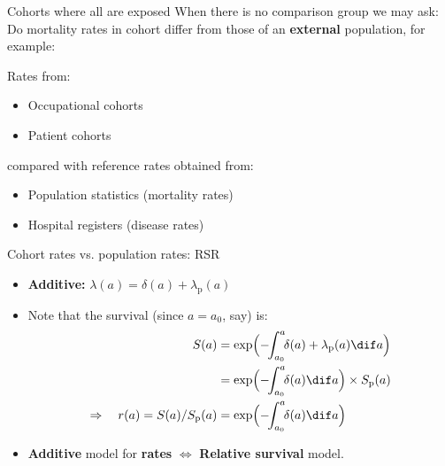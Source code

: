 \begin{frame}{Cohorts where all are exposed}
When there is no comparison group we may ask:\\
Do mortality rates in cohort differ from those of an
\textbf{external} population, for example:

\pause
Rates from:
\begin{itemize}
\item Occupational cohorts
\item Patient cohorts
\end{itemize}
\pause
compared with reference rates obtained from:
\begin{itemize}
\item Population statistics (mortality rates)
\item Hospital registers (disease rates)
\end{itemize}
\end{frame}

\begin{frame}{Cohort rates vs. population rates: RSR}
  \begin{itemize}
  \item \textbf{Additive:} $\lambda(a) = \delta(a) + \lambda_\text{p}(a)$
  \item Note that the survival (since $a=a_0$, say) is: \vspace*{-1ex}
\begin{align*}
     S(a) &= \exp\Bigl(-\!\!\int_{a_0}^a\!\! \delta(a) + \lambda_\text{p}(a) \dif a\Bigr)\\
          &= \exp\Bigl(-\!\!  \int_{a_0}^a\!\! \delta(a) \dif a\Bigr) \times S_\text{p}(a)\\
    \Rightarrow \quad
    r(a) = S(a)/S_\text{p}(a) &= \exp\Bigl(-\!\!\int_{a_0}^a\!\! \delta(a) \dif a\Bigr)
  \end{align*}

  \item \textbf{Additive} model for \textbf{rates} $\Leftrightarrow$ \textbf{Relative survival} model.
  \end{itemize}
\end{frame}

